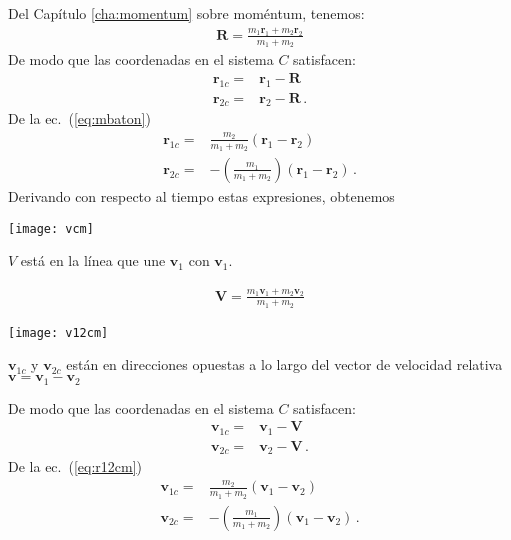 Del Capítulo \ref{cha:momentum} sobre moméntum, tenemos:
  \begin{align}
    \label{eq:mbaton}
    \mathbf{R}=\frac{m_1\mathbf{r}_1+m_2\mathbf{r}_2}{m_1+m_2}
  \end{align}
De modo que las coordenadas en el sistema $C$ satisfacen:
\begin{align}
  \mathbf{r}_{1c} =&\mathbf{r}_1-\mathbf{R}\nonumber\\
  \mathbf{r}_{2c}=&\mathbf{r}_2-\mathbf{R}\,.
\end{align}
De la ec.~(\ref{eq:mbaton})
\begin{align}
\label{eq:r12cm}
  \mathbf{r}_{1c}
    =&\frac{m_2}{m_1+m_2}(\mathbf{r}_1-\mathbf{r}_2)\nonumber\\
 \mathbf{r}_{2c}=&-\left(\frac{m_1}{m_1+m_2} \right)\left(\mathbf{r}_1-\mathbf{r}_2 \right)\,.
\end{align}
Derivando con respecto al tiempo estas expresiones, obtenemos
 
\begin{minipage}{0.5\linewidth}
  \texttt{[image: vcm]}

\noindent
$V$ está en la línea que une $\mathbf{v}_1$ con $\mathbf{v}_1$.
\end{minipage}
\begin{minipage}{0.5\linewidth}
  \begin{align}
    \label{eq:Vcm}
    \mathbf{V}=\frac{m_1\mathbf{v}_1+m_2\mathbf{v}_2}{m_1+m_2}
  \end{align}
\end{minipage}


\begin{minipage}{0.5\linewidth}
  \texttt{[image: v12cm]}

\noindent
$\mathbf{v}_{1c}$ y $\mathbf{v}_{2c}$ están en direcciones opuestas a lo largo del vector de velocidad relativa $\mathbf{v}=\mathbf{v}_1-\mathbf{v}_2$
\end{minipage}
\begin{minipage}{0.5\linewidth}
De modo que las coordenadas en el sistema $C$ satisfacen:
\begin{align}
  \label{eq:v12cm}
  \mathbf{v}_{1c} =&\mathbf{v}_1-\mathbf{V}\nonumber\\
  \mathbf{v}_{2c}=&\mathbf{v}_2-\mathbf{V}\,.
\end{align}
De la ec.~(\ref{eq:r12cm})
\begin{align}
  \label{eq:v12cm12}
  \mathbf{v}_{1c}
    =&\frac{m_2}{m_1+m_2}(\mathbf{v}_1-\mathbf{v}_2)\nonumber\\
 \mathbf{v}_{2c}=&-\left(\frac{m_1}{m_1+m_2} \right)\left(\mathbf{v}_1-\mathbf{v}_2 \right)\,.
\end{align}
\end{minipage}
  
